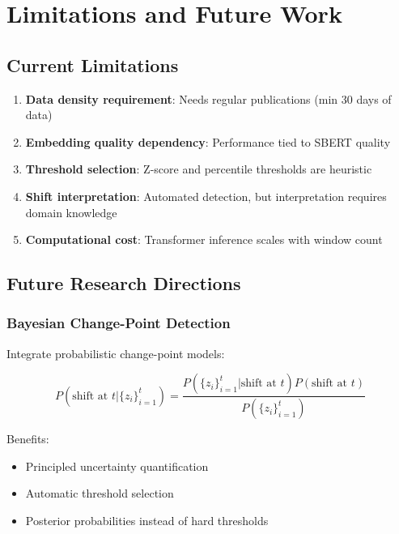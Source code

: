 \documentclass[12pt]{article}
\begin{document}
\newpage

\section{Limitations and Future Work}

\subsection{Current Limitations}

\begin{enumerate}
    \item \textbf{Data density requirement}: Needs regular publications (min 30 days of data)
    \item \textbf{Embedding quality dependency}: Performance tied to SBERT quality
    \item \textbf{Threshold selection}: Z-score and percentile thresholds are heuristic
    \item \textbf{Shift interpretation}: Automated detection, but interpretation requires domain knowledge
    \item \textbf{Computational cost}: Transformer inference scales with window count
\end{enumerate}

\subsection{Future Research Directions}

\subsubsection{Bayesian Change-Point Detection}

Integrate probabilistic change-point models:

\begin{equation}
P(\text{shift at } t | \{z_i\}_{i=1}^{t}) = \frac{P(\{z_i\}_{i=1}^{t} | \text{shift at } t) P(\text{shift at } t)}{P(\{z_i\}_{i=1}^{t})}
\end{equation}

Benefits:
\begin{itemize}
    \item Principled uncertainty quantification
    \item Automatic threshold selection
    \item Posterior probabilities instead of hard thresholds
\end{itemize}
\end{document}

